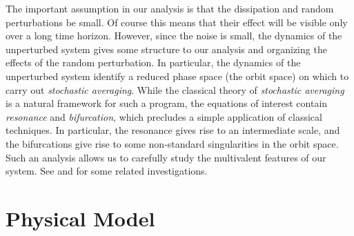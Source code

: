 The important assumption in our analysis is that the dissipation and random perturbations be small. Of course this means that their effect will be visible only over a long time horizon. However, since the noise is small, the dynamics of the unperturbed system gives some structure to our analysis and organizing the effects of the random perturbation. In particular, the dynamics of the unperturbed system identify a reduced phase space (the orbit space) on which to carry out \emph{stochastic averaging}. While the classical theory of \emph{stochastic averaging} is a natural framework for such a program, the equations of interest contain \emph{resonance} and \emph{bifurcation}, which precludes a simple application of classical techniques. In particular, the resonance gives rise to an intermediate scale, and the bifurcations give rise to some non-standard singularities in the orbit space. Such an analysis allows us to carefully study the multivalent features of our system. See \citet{freidlin94:_random_pertur_of_hamil_system,freidlin98:_random_pertur_nonlin_oscil,namachchivaya01:_non_duffin_pol} and \citet{sowers02:_stoch_averag_with_flatt_hamil} for some related investigations.

\section{Physical Model}
\label{S:model}

